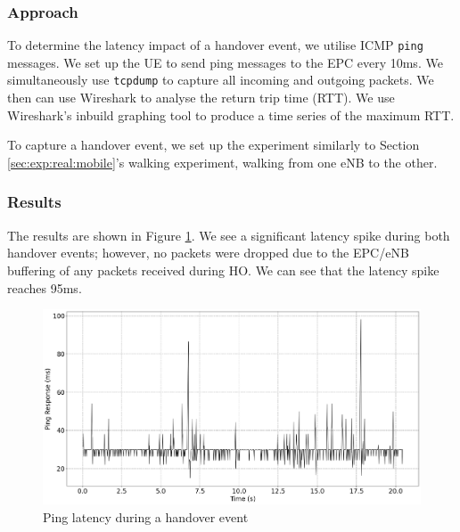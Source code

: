 \subsubsection{Approach}
To determine the latency impact of a handover event, we utilise ICMP \texttt{ping} messages. We set up the UE to send ping messages to the EPC every 10ms. We simultaneously use \texttt{tcpdump}\cite{tcpdump} to capture all incoming and outgoing packets. We then can use Wireshark\cite{wireshark} to analyse the return trip time (RTT). We use Wireshark's inbuild graphing tool to produce a time series of the maximum RTT.


To capture a handover event, we set up the experiment similarly to Section \ref{sec:exp:real:mobile}'s walking experiment, walking from one eNB to the other.
\subsubsection{Results}
The results are shown in Figure \ref{fig:methods:ping-handover}.  We see a significant latency spike during both handover events; however, no packets were dropped due to the EPC/eNB buffering of any packets received during HO. We can see that the latency spike reaches 95ms. 
\begin{figure}
    \centering
    \includegraphics[width=0.75\linewidth]{src//img/ping-handover-hd.png}
    \caption{Ping latency during a handover event}
    \label{fig:methods:ping-handover}
\end{figure}

